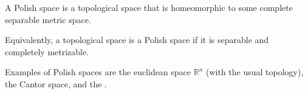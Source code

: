 \documentclass[12pt]{article}
\begin{document}
A Polish space is a topological space that is homeomorphic to some complete separable metric space.

Equivalently, a topological space is a Polish space if it is separable and completely metrizable.

Examples of Polish spaces are the euclidean space $\mathbb{R}^n$ (with the usual topology), the Cantor space, and the .
\end{document}
